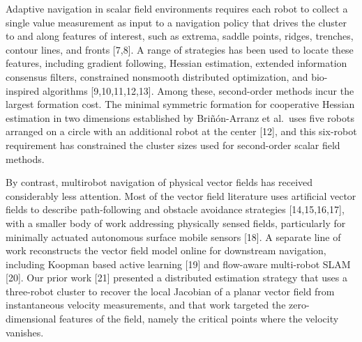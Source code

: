 \documentclass[lettersize,journal]{IEEEtran}
\begin{document}
Adaptive navigation in scalar field environments requires each robot to collect a single value measurement as input to a navigation policy that drives the cluster to and along features of interest, such as extrema, saddle points, ridges, trenches, contour lines, and fronts [7,8]. A range of strategies has been used to locate these features, including gradient following, Hessian estimation, extended information consensus filters, constrained nonsmooth distributed optimization, and bio-inspired algorithms [9,10,11,12,13]. Among these, second-order methods incur the largest formation cost. The minimal symmetric formation for cooperative Hessian estimation in two dimensions established by Bri\~n\'on-Arranz et al.\ uses five robots arranged on a circle with an additional robot at the center [12], and this six-robot requirement has constrained the cluster sizes used for second-order scalar field methods.

By contrast, multirobot navigation of physical vector fields has received considerably less attention. Most of the vector field literature uses artificial vector fields to describe path-following and obstacle avoidance strategies [14,15,16,17], with a smaller body of work addressing physically sensed fields, particularly for minimally actuated autonomous surface mobile sensors [18]. A separate line of work reconstructs the vector field model online for downstream navigation, including Koopman based active learning [19] and flow-aware multi-robot SLAM [20]. Our prior work [21] presented a distributed estimation strategy that uses a three-robot cluster to recover the local Jacobian of a planar vector field from instantaneous velocity measurements, and that work targeted the zero-dimensional features of the field, namely the critical points where the velocity vanishes.
\end{document}
